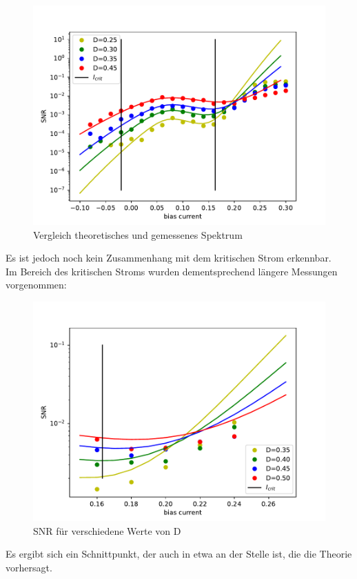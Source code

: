 \documentclass[12pt,a4paper]{article}
\begin{document}
\begin{figure}[H]
	\centering
	\includegraphics[scale=0.9]{snrautoreal13a25snrsp.pdf}
	\caption{Vergleich theoretisches und gemessenes Spektrum}
	\label{deltaspectrum}
\end{figure}
Es ist jedoch noch kein Zusammenhang mit dem kritischen Strom erkennbar.\\
Im Bereich des kritischen Stroms wurden dementsprechend längere Messungen vorgenommen:
\begin{figure}[H]
	\centering
	\includegraphics[scale=0.9]{snrpoi31a.pdf}
	\caption{SNR für verschiedene Werte von D}
	\label{drange}
\end{figure}
Es ergibt sich ein Schnittpunkt, der auch in etwa an der Stelle ist, die die Theorie vorhersagt. 
\end{document}
